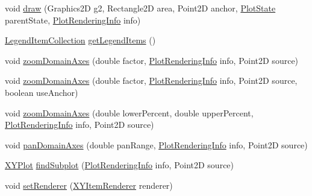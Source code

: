 \begin{DoxyCompactItemize}
\item 
void \mbox{\hyperlink{classorg_1_1jfree_1_1chart_1_1plot_1_1_combined_range_x_y_plot_a82826d6812d6f9e56db8303c0c55240d}{draw}} (Graphics2D g2, Rectangle2D area, Point2D anchor, \mbox{\hyperlink{classorg_1_1jfree_1_1chart_1_1plot_1_1_plot_state}{Plot\+State}} parent\+State, \mbox{\hyperlink{classorg_1_1jfree_1_1chart_1_1plot_1_1_plot_rendering_info}{Plot\+Rendering\+Info}} info)
\item 
\mbox{\hyperlink{classorg_1_1jfree_1_1chart_1_1_legend_item_collection}{Legend\+Item\+Collection}} \mbox{\hyperlink{classorg_1_1jfree_1_1chart_1_1plot_1_1_combined_range_x_y_plot_a5b4e754fb06e91d483aa6850c74a36a3}{get\+Legend\+Items}} ()
\item 
void \mbox{\hyperlink{classorg_1_1jfree_1_1chart_1_1plot_1_1_combined_range_x_y_plot_ac68deced95cb5e078066bf097c0831f9}{zoom\+Domain\+Axes}} (double factor, \mbox{\hyperlink{classorg_1_1jfree_1_1chart_1_1plot_1_1_plot_rendering_info}{Plot\+Rendering\+Info}} info, Point2D source)
\item 
void \mbox{\hyperlink{classorg_1_1jfree_1_1chart_1_1plot_1_1_combined_range_x_y_plot_a9973c03317f5ab913d1e486274e04964}{zoom\+Domain\+Axes}} (double factor, \mbox{\hyperlink{classorg_1_1jfree_1_1chart_1_1plot_1_1_plot_rendering_info}{Plot\+Rendering\+Info}} info, Point2D source, boolean use\+Anchor)
\item 
void \mbox{\hyperlink{classorg_1_1jfree_1_1chart_1_1plot_1_1_combined_range_x_y_plot_ab76144ac2ca476eaa44eeee4d662b3e6}{zoom\+Domain\+Axes}} (double lower\+Percent, double upper\+Percent, \mbox{\hyperlink{classorg_1_1jfree_1_1chart_1_1plot_1_1_plot_rendering_info}{Plot\+Rendering\+Info}} info, Point2D source)
\item 
void \mbox{\hyperlink{classorg_1_1jfree_1_1chart_1_1plot_1_1_combined_range_x_y_plot_a3124b90fe437b15a01a34a638042f9fb}{pan\+Domain\+Axes}} (double pan\+Range, \mbox{\hyperlink{classorg_1_1jfree_1_1chart_1_1plot_1_1_plot_rendering_info}{Plot\+Rendering\+Info}} info, Point2D source)
\item 
\mbox{\hyperlink{classorg_1_1jfree_1_1chart_1_1plot_1_1_x_y_plot}{X\+Y\+Plot}} \mbox{\hyperlink{classorg_1_1jfree_1_1chart_1_1plot_1_1_combined_range_x_y_plot_abc986774fb1a19f5d9f5320e8dd5a854}{find\+Subplot}} (\mbox{\hyperlink{classorg_1_1jfree_1_1chart_1_1plot_1_1_plot_rendering_info}{Plot\+Rendering\+Info}} info, Point2D source)
\item 
void \mbox{\hyperlink{classorg_1_1jfree_1_1chart_1_1plot_1_1_combined_range_x_y_plot_ae91c0c565cc226f17b35d5dfbee8b49c}{set\+Renderer}} (\mbox{\hyperlink{interfaceorg_1_1jfree_1_1chart_1_1renderer_1_1xy_1_1_x_y_item_renderer}{X\+Y\+Item\+Renderer}} renderer)

\end{DoxyCompactItemize}
